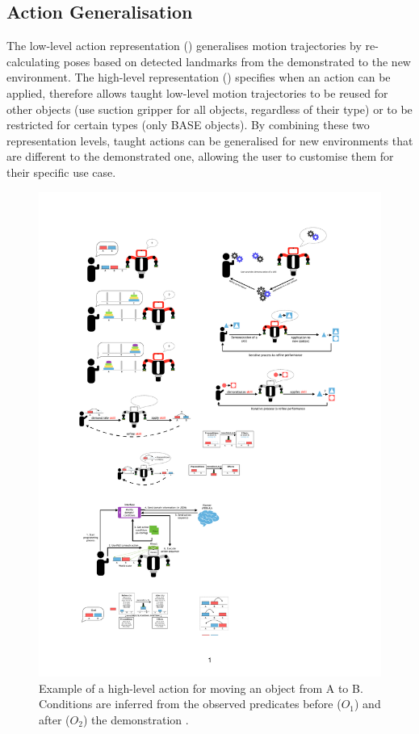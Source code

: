 \subsection{Action Generalisation}
\label{sec:generalisation}
The low-level action representation () generalises motion trajectories by re-calculating poses based on detected landmarks from the demonstrated to the new environment.
The high-level representation () specifies when an action can be applied, therefore allows taught low-level motion trajectories to be reused for other objects (\eg use suction gripper for all objects, regardless of their type) or to be restricted for certain types (\eg only BASE objects).
By combining these two representation levels, taught actions can be generalised for new environments that are different to the demonstrated one, allowing the user to customise them for their specific use case.


\begin{figure}
	\centering
	\includegraphics[width=0.9\linewidth]{Fig7.pdf}
	\caption{Example of a high-level action for moving an object from A to B. Conditions are inferred from the observed predicates before ($O_1$) and after ($O_2$) the demonstration \cite{liang2019d}.
	}
	\label{fig:action-model}
\end{figure}

